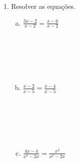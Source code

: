 \documentclass[a4paper,14pt]{article}
\begin{document}
\begin{multicols}{2}
\begin{enumerate}
\begin{enumerate}[a)]
    		\end{enumerate}
    		\item Resolver as equações.
    		\begin{enumerate}[a)]
    			\item $\frac{3x - 2}{x - 2} = \frac{x - 6}{x - 2}$ \\\\\\\\\\\\
    			\item $\frac{x - 2}{x - 5} = \frac{x - 4}{x - 5}$ \\\\\\\\\\\\
    			\item $\frac{4x - 4}{x^2 - 2x} = \frac{x^2}{x^2 - 2x}$ \\\\\\\\\\\\
    		\end{enumerate}
    	\end{enumerate}
    \end{multicols}
\end{document}
